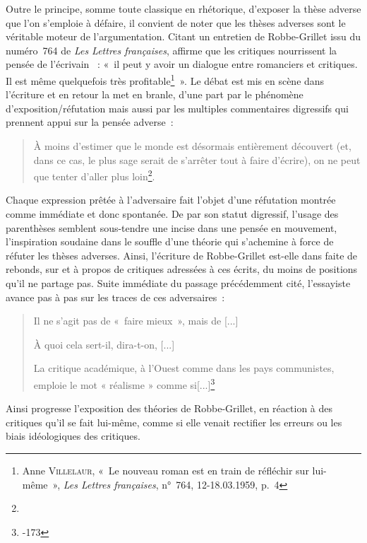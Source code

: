 Outre le principe, somme toute classique en rhétorique, d'exposer la thèse adverse que l'on s'emploie à défaire, il convient de noter que les thèses adverses sont le véritable moteur de l'argumentation. Citant un entretien de Robbe-Grillet issu du numéro~764 de \textit{Les Lettres françaises}, \galia{} affirme que les critiques nourrissent la pensée de l'écrivain \robbe~: «~il peut y avoir un dialogue entre romanciers et critiques. Il est même quelquefois très profitable\footnote{Anne \textsc{Villelaur}, «~Le nouveau roman est en train de réfléchir sur lui-même~», \textit{Les Lettres françaises}, n°~764, 12-18.03.1959, p.~4}~». Le débat est mis en scène dans l'écriture et en retour la met en branle, d'une part par le phénomène d'exposition/réfutation mais aussi par les multiples commentaires digressifs qui prennent appui sur la pensée adverse~: 
\begin{quote}
À moins d’estimer que le monde est désormais entièrement découvert (et, dans ce cas, le plus sage serait de s’arrêter tout à faire d’écrire), on ne peut que tenter d’aller plus loin\footnote{}.    
\end{quote}
Chaque expression prêtée à l'adversaire fait l'objet d'une réfutation montrée comme immédiate et donc spontanée. De par son statut digressif, l'usage des parenthèses semblent sous-tendre une incise dans une pensée en mouvement, l'inspiration soudaine dans le souffle d'une théorie qui s'achemine à force de réfuter les thèses adverses. Ainsi, l'écriture de Robbe-Grillet est-elle dans \punr{} faite de rebonds, sur et à propos de critiques adressées à ces écrits, du moins de positions qu'il ne partage pas. Suite immédiate du passage précédemment cité, l'essayiste avance pas à pas sur les traces de ces adversaires~:
\begin{quote}
    Il ne s’agit pas de «~faire mieux~», mais de [...]
    
    À quoi cela sert-il, dira-t-on, [...]
    
    La critique académique, à l’Ouest comme dans les pays communistes, emploie le mot « réalisme » comme si[...]\footnote{-173}
\end{quote}

Ainsi progresse l'exposition des théories de Robbe-Grillet, en réaction à des critiques qu'il se fait lui-même, comme si elle venait rectifier les erreurs ou les biais idéologiques des critiques.



